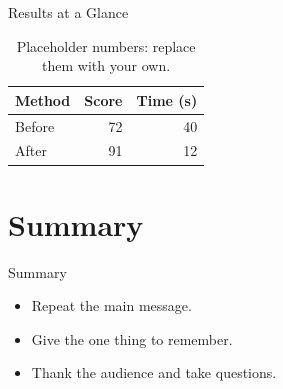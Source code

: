 \documentclass[aspectratio=169, 11pt]{beamer}
\begin{document}
\begin{frame}{Results at a Glance}
  \begin{table}
    \centering
    \begin{tabular}{lrr}
      \toprule
      Method & Score & Time (s) \\
      \midrule
      Before & 72 & 40 \\
      After & \alert{91} & 12 \\
      \bottomrule
    \end{tabular}
    \caption{Placeholder numbers: replace them with your own.}
  \end{table}
\end{frame}

\section{Summary}

\begin{frame}{Summary}
  \begin{itemize}
    \item Repeat the main message.
    \item Give the one thing to remember.
    \item Thank the audience and take questions.
  \end{itemize}
\end{frame}
\end{document}
